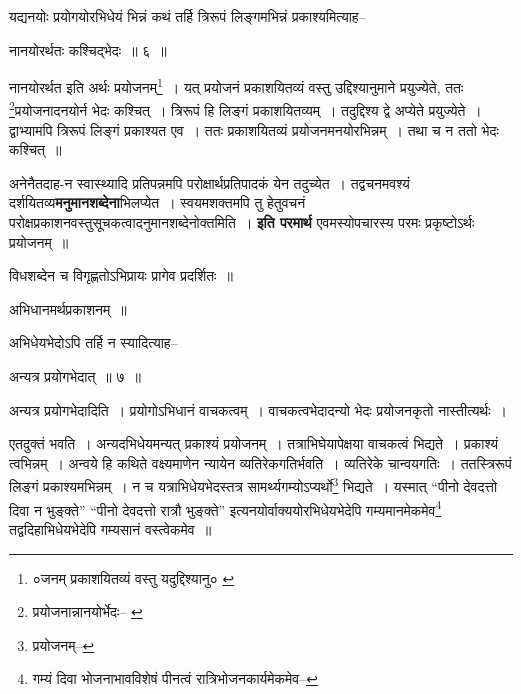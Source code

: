 \documentclass[article,12pt,a4paper]{memoir}
\begin{document}
	  \pstart यद्यनयोः प्रयोगयोरभिधेयं भिन्नं कथं तर्हि त्रिरूपं लिङ्गमभिन्नं प्रकाश्यमित्याह--
	\pend
       
	  \bigskip
	  \begingroup
	

	  \pstart नानयोरर्थतः कश्चिद्भेदः ॥ ६ ॥
	\pend
      
	  \endgroup
	 

	  \pstart नानयोरर्थत इति अर्थः प्रयोजनम्\footnote{०जनम् प्रकाशयितव्यं वस्तु यदुद्दिश्यानु० \cite{dp-msA} \cite{dp-edP} \cite{dp-edH} \cite{dp-edE} \cite{dp-edN}} । यत् प्रयोजनं प्रकाशयितव्यं वस्तु उद्दिश्यानुमाने प्रयुज्येते, ततः \footnote{प्रयोजनान्नानयोर्भेदः--\cite{dp-msB} \cite{dp-msD}}प्रयोजनादनयोर्न भेदः कश्चित् । त्रिरूपं हि लिङ्गं प्रकाशयितव्यम् । तदुद्दिश्य द्वे अप्येते प्रयुज्येते । द्वाभ्यामपि त्रिरूपं लिङ्गं प्रकाश्यत एव । ततः प्रकाशयितव्यं प्रयोजनमनयोरभिन्नम् । तथा च न ततो भेदः कश्चित् ॥
	\pend
      
	  \endgroup
	

	  \pstart अनेनैतदाह-न स्वास्थ्यादि प्रतिपन्नमपि परोक्षार्थप्रतिपादकं येन तदुच्येत । तद्वचनमवश्यं दर्शयितव्य\textbf{मनुमानशब्देना}भिलप्येत । स्वयमशक्तमपि तु हेतुवचनं परोक्षप्रकाशनवस्तुसूचकत्वादनुमानशब्देनोक्तमिति । \textbf{इति परमार्थ} एवमस्योपचारस्य परमः प्रकृष्टोऽर्थः प्रयोजनम् ॥
	\pend
      

	  \pstart विधशब्देन च विगृह्णतोऽभिप्रायः प्रागेव प्रदर्शितः ॥
	\pend
      

	  \pstart अभिधानमर्थप्रकाशनम् ॥
	\pend
      \leavevmode{}
	  \bigskip
	  \begingroup
	

	  \pstart अभिधेयभेदोऽपि तर्हि न स्यादित्याह--
	\pend
       
	  \bigskip
	  \begingroup
	

	  \pstart अन्यत्र प्रयोगभेदात् ॥ ७ ॥
	\pend
      
	  \endgroup
	 

	  \pstart अन्यत्र प्रयोगभेदादिति । प्रयोगोऽभिधानं वाचकत्वम् । वाचकत्वभेदादन्यो भेदः प्रयोजनकृतो नास्तीत्यर्थः ।
	\pend
       

	  \pstart एतदुक्तं भवति । अन्यदभिधेयमन्यत् प्रकाश्यं प्रयोजनम् । तत्राभिघेयापेक्षया वाचकत्वं भिद्यते । प्रकाश्यं त्वभिन्नम् । अन्वये हि कथिते वक्ष्यमाणेन न्यायेन व्यतिरेकगतिर्भवति । व्यतिरेके चान्वयगतिः । ततस्त्रिरूपं लिङ्गं प्रकाश्यमभिन्नम् । न च यत्राभिधेयभेदस्तत्र सामर्थ्यगम्योऽप्यर्थो\footnote{प्रयोजनम्--\cite{dp-msD-n}} भिद्यते । यस्मात् “पीनो देवदत्तो दिवा न भुङ्क्ते” “पीनो देवदत्तो रात्रौ भुङ्क्ते” इत्यनयोर्वाक्ययोरभिधेयभेदेपि गम्यमानमेकमेव\footnote{गम्यं दिवा भोजनाभावविशेषं पीनत्वं रात्रिभोजनकार्यमेकमेव--\cite{dp-msD-n}} तद्वदिहाभिधेयभेदेपि गम्यसानं वस्त्वेकमेव ॥
	\pend
      
\end{document}
